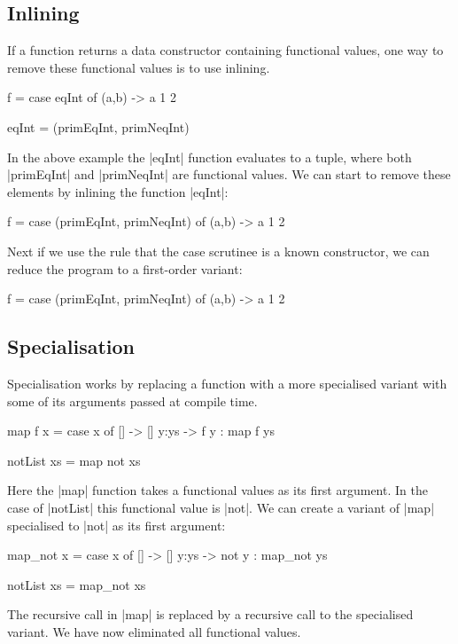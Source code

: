 \documentclass[preprint]{sigplanconf}
\begin{document}
\subsection{Inlining}

If a function returns a data constructor containing functional values, one way to remove these functional values is to use inlining.

\begin{example}
\begin{code}
f = case  eqInt of
          (a,b) -> a 1 2

eqInt = (primEqInt, primNeqInt)
\end{code}

In the above example the |eqInt| function evaluates to a tuple, where both |primEqInt| and |primNeqInt| are functional values. We can start to remove these elements by inlining the function |eqInt|:

\begin{code}
f = case  (primEqInt, primNeqInt) of
          (a,b) -> a 1 2
\end{code}

Next if we use the rule that the case scrutinee is a known constructor, we can reduce the program to a first-order variant:

\begin{code}
f = case  (primEqInt, primNeqInt) of
          (a,b) -> a 1 2
\end{code}
\end{example}

\subsection{Specialisation}

Specialisation works by replacing a function with a more specialised variant with some of its arguments passed at compile time.

\begin{example}
\begin{code}
map f x = case  x of
                []    -> []
                y:ys  -> f y : map f ys

notList xs = map not xs
\end{code}

Here the |map| function takes a functional values as its first argument. In the case of |notList| this functional value is |not|. We can create a variant of |map| specialised to |not| as its first argument:

\begin{code}
map_not x = case  x of
                  []    -> []
                  y:ys  -> not y : map_not ys

notList xs = map_not xs
\end{code}

The recursive call in |map| is replaced by a recursive call to the specialised variant. We have now eliminated all functional values.
\end{example}
\end{document}
